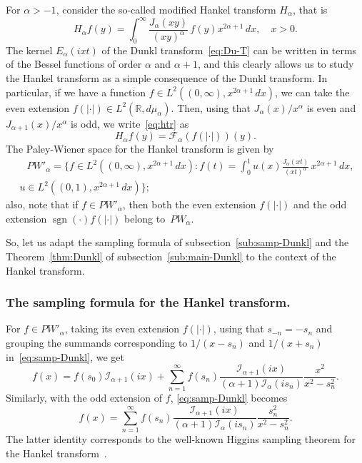 \documentclass[11pt,a4paper]{amsart}
\theoremstyle{plain}
\theoremstyle{definition}
\newcommand{\R}{\mathbb{R}}
\newcommand{\calF}{\mathcal{F}}
\newcommand{\calI}{\mathcal{I}}
\begin{document}
For $\alpha>-1$, consider the so-called modified Hankel transform $H_{\alpha}$, that is
\begin{equation}
\label{eq:htr}
  H_{\alpha}f(y) = \int_{0}^{\infty} \frac{J_{\alpha}(xy)}{(xy)^{\alpha}}
  \,f(y)x^{2\alpha+1}\,dx, \quad x>0.
\end{equation}
The kernel $E_\alpha(ixt)$ of the Dunkl transform~\eqref{eq:Du-T}
can be written in terms of the Bessel functions of order $\alpha$ and
$\alpha+1$, and this clearly allows us to study the Hankel transform
as a simple consequence of the Dunkl transform. In particular, if
we have a function $f \in L^2((0,\infty),x^{2\alpha+1}\,dx)$, we
can take the even extension $f(|\cdot|) \in L^2(\R,d\mu_\alpha)$.
Then, using that $J_{\alpha}(x)/x^\alpha$ is even and
$J_{\alpha+1}(x)/x^\alpha$ is odd, we write~\eqref{eq:htr} as
\begin{equation*}
  H_{\alpha}f(y)
  = \calF_{\alpha}(f(|\cdot|))(y).
\end{equation*}
The Paley-Wiener space for the Hankel transform is given by
\begin{multline*}
  \quad
  PW'_{\alpha} = \Bigg\{ f\in L^{2}((0,\infty),x^{2\alpha+1}\,dx)
  : f(t) = \int_{0}^{1} u(x) \frac{J_{\alpha}(xt)}{(xt)^\alpha}\,x^{2\alpha+1}\,dx,\\
  \; u\in L^{2}((0,1),x^{2\alpha+1}\,dx) \Bigg\};
  \quad
\end{multline*}
also, note that if $f \in PW'_{\alpha}$, then both the even
extension $f(|\cdot|)$ and the odd extension
$\operatorname{sgn}(\cdot)f(|\cdot|)$ belong to~$PW_{\alpha}$.

So, let us adapt the sampling formula of
subsection~\ref{sub:samp-Dunkl} and the Theorem~\ref{thm:Dunkl} of
subsection~\ref{sub:main-Dunkl} to the context of the Hankel
transform.

\subsubsection{The sampling formula for the Hankel transform.}

For $f \in PW'_{\alpha}$, taking its even extension $f(|\cdot|)$,
using that $s_{-n} = -s_n$ and grouping the summands corresponding
to $1/(x-s_n)$ and $1/(x+s_n)$ in~\eqref{eq:samp-Dunkl}, we get
\begin{equation*}
  f(x) = f(s_0) \calI_{\alpha+1}(ix)
  + \sum_{n=1}^{\infty} f(s_n)
    \frac{\calI_{\alpha+1}(ix)}{(\alpha+1)\calI_{\alpha}(is_n)}
    \frac{x^2}{x^2-s_n^2}.
\end{equation*}
Similarly, with the odd extension of $f$, \eqref{eq:samp-Dunkl} becomes
\begin{equation*}
  f(x) = \sum_{n=1}^{\infty} f(s_n)
    \frac{\calI_{\alpha+1}(ix)}{(\alpha+1)\calI_{\alpha}(is_n)}
    \frac{s_n^2}{x^2-s_n^2}.
\end{equation*}
The latter identity corresponds to the well-known Higgins sampling theorem for the Hankel transform~\cite{Higgins}.
\end{document}

